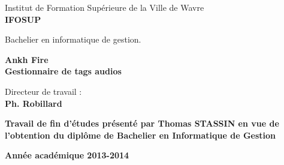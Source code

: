 \begin{titlepage}
\vfill


\begin{center}
\Large{Institut de Formation Supérieure de la Ville de Wavre}\\

\textbf{\Huge{IFOSUP}}
\end{center}

\begin{center}
\LARGE{Bachelier en informatique de gestion.}
\end{center}

\vfill

\begin{center}
\bf
\LARGE{Ankh Fire}\\
\Large{Gestionnaire de tags audios}
\end{center}

\vfill


\begin{flushleft}
Directeur de travail :\\
\textbf{Ph. Robillard}
\end{flushleft}

\begin{flushright}
\bf
Travail de fin d'études présenté par Thomas STASSIN en vue de l'obtention du diplôme de Bachelier en Informatique de Gestion
\end{flushright}

\begin{center}
\textbf{Année académique 2013-2014}
\end{center}


\end{titlepage}